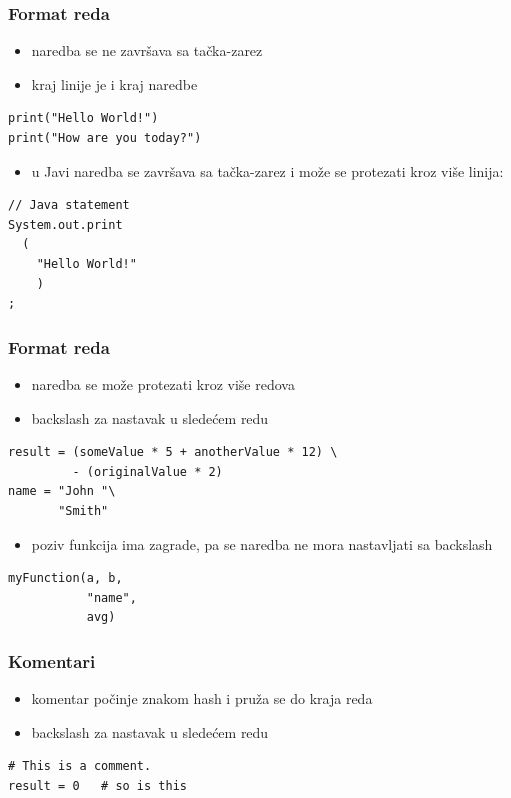 \documentclass[compress]{beamer}
\begin{document}
\begin{frame}[fragile]
\frametitle{Format reda}
\begin{itemize}
  \item naredba se ne završava sa tačka-zarez
  \item kraj linije je i kraj naredbe
\end{itemize}
\begin{verbatim}
print("Hello World!")
print("How are you today?")
\end{verbatim}

\begin{itemize}
  \item u Javi naredba se završava sa tačka-zarez i može se protezati kroz više
linija:
\end{itemize}
\begin{verbatim}
// Java statement
System.out.print
  (
    "Hello World!"
    )
;
\end{verbatim}
\end{frame}

\begin{frame}[fragile]
\frametitle{Format reda}
\begin{itemize}
  \item naredba se može protezati kroz više redova
  \item backslash za nastavak u sledećem redu
\end{itemize}
\begin{verbatim}
result = (someValue * 5 + anotherValue * 12) \
         - (originalValue * 2)
name = "John "\
       "Smith"
\end{verbatim}

\begin{itemize}
  \item poziv funkcija ima zagrade, pa se naredba ne mora nastavljati sa 
    backslash
\end{itemize}
\begin{verbatim}
myFunction(a, b,
           "name",
           avg)
\end{verbatim}
\end{frame}
  
\begin{frame}[fragile]
\frametitle{Komentari}
\begin{itemize}
  \item komentar počinje znakom hash i pruža se do kraja reda
  \item backslash za nastavak u sledećem redu
\end{itemize}
\begin{verbatim}
# This is a comment.
result = 0   # so is this
\end{verbatim}
\end{frame}
  
\end{document}
